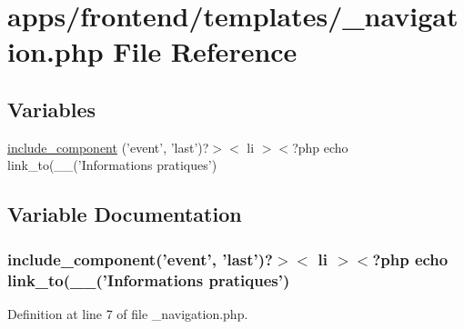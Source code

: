 \hypertarget{frontend_2templates_2__navigation_8php}{\section{apps/frontend/templates/\-\_\-navigation.php File Reference}
\label{frontend_2templates_2__navigation_8php}
}
\subsection*{Variables}
\begin{DoxyCompactItemize}
\item 
\hyperlink{frontend_2templates_2__navigation_8php_a0f87936cfbec594a177cabbcec470b8d}{include\-\_\-component} ('event', 'last')?$>$$<$ li $>$$<$?php echo link\-\_\-to(\-\_\-\-\_\-('Informations pratiques')
\end{DoxyCompactItemize}


\subsection{Variable Documentation}
\hypertarget{frontend_2templates_2__navigation_8php_a0f87936cfbec594a177cabbcec470b8d}{
\subsubsection[{include\-\_\-component}]{\setlength{\rightskip}{0pt plus 5cm}include\-\_\-component('event', 'last')?$>$$<$ li $>$$<$?php echo link\-\_\-to(\-\_\-\-\_\-('Informations pratiques')}}\label{frontend_2templates_2__navigation_8php_a0f87936cfbec594a177cabbcec470b8d}


Definition at line 7 of file \-\_\-navigation.\-php.

